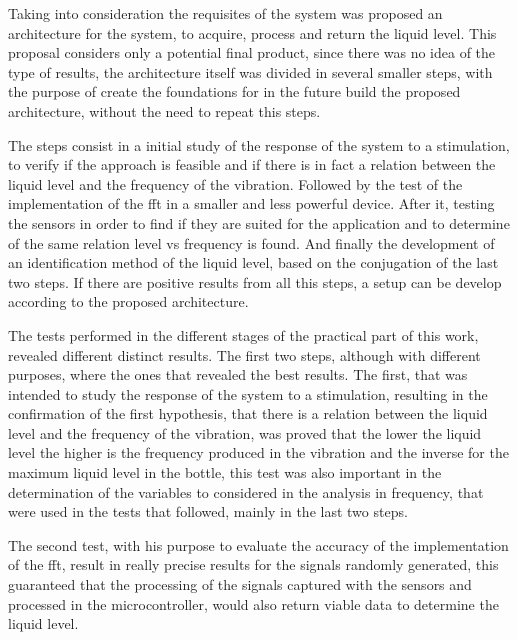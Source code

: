 Taking into consideration the requisites of the system was proposed an architecture for the system, to acquire, process and return the liquid level. This proposal considers only a potential final product, since there was no idea of the type of results, the architecture itself was divided in several smaller steps, with the purpose of create the foundations for in the future build the proposed architecture, without the need to repeat this steps. 

The steps consist in a initial study of the response of the system to a stimulation, to verify if the approach is feasible and if there is in fact a relation between the liquid level and the frequency of the vibration. Followed by the test of the implementation of the \acrshort{fft} in a smaller and less powerful device. After it, testing the sensors in order to find if they are suited for the application and to determine of the same relation level vs frequency is found. And finally the development of an identification method of the liquid level, based on the conjugation of the last two steps. If there are positive results from all this steps, a setup can be develop according to the proposed architecture.

The tests performed in the different stages of the practical part of this work, revealed different distinct results. The first two steps, although with different purposes, where the ones that revealed the best results. The first, that was intended to study the response of the system to a stimulation, resulting in the confirmation of the first hypothesis, that there is a relation between the liquid level and the frequency of the vibration, was proved that the lower the liquid level the higher is the frequency produced in the vibration and the inverse for the maximum liquid level in the bottle, this test was also important in the determination of the variables to considered in the analysis in frequency, that were used in the tests that followed, mainly in the last two steps.

The second test, with his purpose to evaluate the accuracy of the implementation of the \acrshort{fft}, result in really precise results for the signals randomly generated, this guaranteed that the processing of the signals captured with the sensors and processed in the microcontroller, would also return viable data to determine the liquid level.

